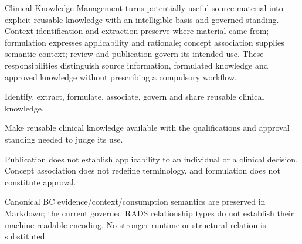 Clinical Knowledge Management turns potentially useful source material into explicit reusable knowledge with an intelligible basis and governed standing. Context identification and extraction preserve where material came from; formulation expresses applicability and rationale; concept association supplies semantic context; review and publication govern its intended use. These responsibilities distinguish source information, formulated knowledge and approved knowledge without prescribing a compulsory workflow.



Identify, extract, formulate, associate, govern and share reusable clinical knowledge.



Make reusable clinical knowledge available with the qualifications and approval standing needed to judge its use.



Publication does not establish applicability to an individual or a clinical decision. Concept association does not redefine terminology, and formulation does not constitute approval.



Canonical BC evidence/\allowbreak{}context/\allowbreak{}consumption semantics are preserved in Markdown; the current governed RADS relationship types do not establish their machine-readable encoding. No stronger runtime or structural relation is substituted.



